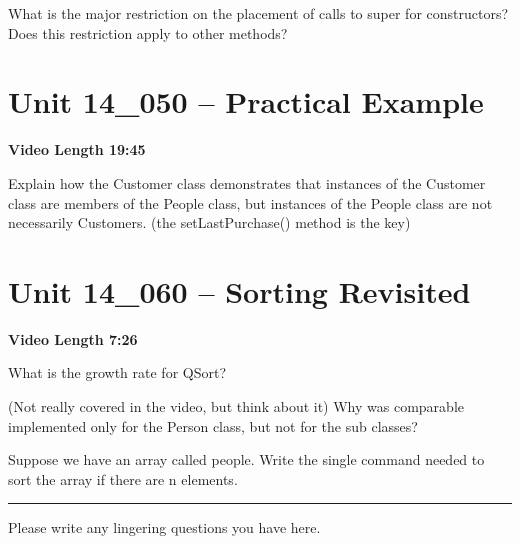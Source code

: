 \documentclass[letterpaper,12pt]{exam}
\newcommand{\unit}{Unit 14}
\begin{document}
\begin{questions}
\begin{samepage}
    \question What is the major restriction on the placement of calls to super for constructors?  Does this restriction apply to other methods?
    \vspace{5mm}
\end{samepage}



\section*{\unit\_050 -- Practical Example} 
\par{\selectfont\textbf{Video Length 19:45}}

\begin{samepage}
    \question Explain how the Customer class demonstrates that instances of the Customer class are members of the People class, but instances of the People class are not necessarily Customers.  (the setLastPurchase() method is the key)
    \vspace{25mm}
\end{samepage}


\section*{\unit\_060 -- Sorting Revisited} 
\par{\selectfont\textbf{Video Length 7:26}}

\begin{samepage}
    \question What is the growth rate for QSort?
    \vspace{5mm}
\end{samepage}

\begin{samepage}
    \question (Not really covered in the video, but think about it) Why was comparable implemented only for the Person class, but not for the sub classes?
    \vspace{5mm}
\end{samepage}

\begin{samepage}
    \question Suppose we have an array called people.  Write the single command needed to sort the array if there are n elements.
    \vspace{5mm}
\end{samepage}


\begin{center}
    \rule{0.5\textwidth}{.4pt}
\end{center}
Please write any lingering questions you have here.
\end{questions}
\end{document}
